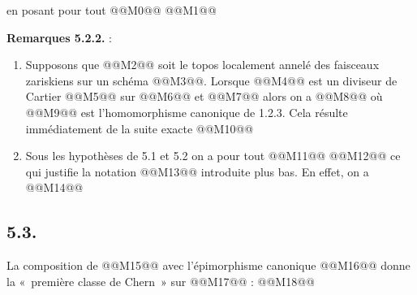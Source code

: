 
en
posant pour tout @@M0@@
@@M1@@

\textbf{Remarques 5.2.2.} :
\begin{enumerate}[label=\alph*)]
\item Supposons que @@M2@@ soit le topos localement annelé des faisceaux zariskiens sur un schéma @@M3@@. Lorsque @@M4@@ est un diviseur de Cartier @@M5@@ sur @@M6@@ et
@@M7@@
alors on a
@@M8@@
où @@M9@@ est l'homomorphisme canonique de 1.2.3. Cela résulte immédiatement de la suite exacte
@@M10@@

\item Sous les hypothèses de 5.1 et 5.2 on a pour tout @@M11@@
@@M12@@
ce qui justifie la notation @@M13@@ introduite plus bas. En effet, on a
@@M14@@
\end{enumerate}

\subsection*{5.3.}
La composition de @@M15@@ avec l'épimorphisme canonique
@@M16@@
donne la «~première classe de Chern~» sur @@M17@@ :
@@M18@@

